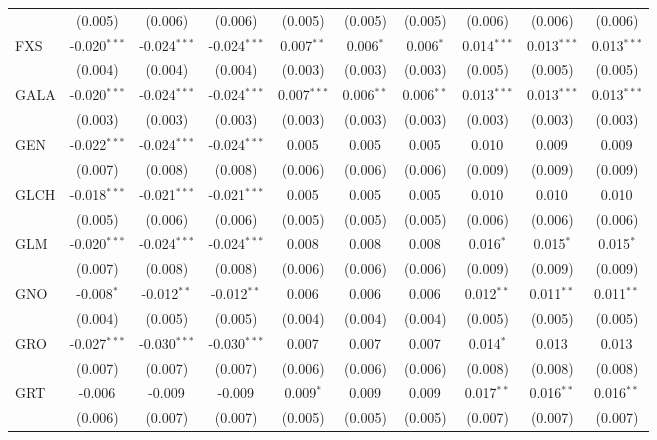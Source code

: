 \begin{table}[!htbp]
\begin{tabular}{@{\extracolsep{5pt}}lccccccccc}
  & (0.005) & (0.006) & (0.006) & (0.005) & (0.005) & (0.005) & (0.006) & (0.006) & (0.006) \\
 FXS & -0.020$^{***}$ & -0.024$^{***}$ & -0.024$^{***}$ & 0.007$^{**}$ & 0.006$^{*}$ & 0.006$^{*}$ & 0.014$^{***}$ & 0.013$^{***}$ & 0.013$^{***}$ \\
  & (0.004) & (0.004) & (0.004) & (0.003) & (0.003) & (0.003) & (0.005) & (0.005) & (0.005) \\
 GALA & -0.020$^{***}$ & -0.024$^{***}$ & -0.024$^{***}$ & 0.007$^{***}$ & 0.006$^{**}$ & 0.006$^{**}$ & 0.013$^{***}$ & 0.013$^{***}$ & 0.013$^{***}$ \\
  & (0.003) & (0.003) & (0.003) & (0.003) & (0.003) & (0.003) & (0.003) & (0.003) & (0.003) \\
 GEN & -0.022$^{***}$ & -0.024$^{***}$ & -0.024$^{***}$ & 0.005$^{}$ & 0.005$^{}$ & 0.005$^{}$ & 0.010$^{}$ & 0.009$^{}$ & 0.009$^{}$ \\
  & (0.007) & (0.008) & (0.008) & (0.006) & (0.006) & (0.006) & (0.009) & (0.009) & (0.009) \\
 GLCH & -0.018$^{***}$ & -0.021$^{***}$ & -0.021$^{***}$ & 0.005$^{}$ & 0.005$^{}$ & 0.005$^{}$ & 0.010$^{}$ & 0.010$^{}$ & 0.010$^{}$ \\
  & (0.005) & (0.006) & (0.006) & (0.005) & (0.005) & (0.005) & (0.006) & (0.006) & (0.006) \\
 GLM & -0.020$^{***}$ & -0.024$^{***}$ & -0.024$^{***}$ & 0.008$^{}$ & 0.008$^{}$ & 0.008$^{}$ & 0.016$^{*}$ & 0.015$^{*}$ & 0.015$^{*}$ \\
  & (0.007) & (0.008) & (0.008) & (0.006) & (0.006) & (0.006) & (0.009) & (0.009) & (0.009) \\
 GNO & -0.008$^{*}$ & -0.012$^{**}$ & -0.012$^{**}$ & 0.006$^{}$ & 0.006$^{}$ & 0.006$^{}$ & 0.012$^{**}$ & 0.011$^{**}$ & 0.011$^{**}$ \\
  & (0.004) & (0.005) & (0.005) & (0.004) & (0.004) & (0.004) & (0.005) & (0.005) & (0.005) \\
 GRO & -0.027$^{***}$ & -0.030$^{***}$ & -0.030$^{***}$ & 0.007$^{}$ & 0.007$^{}$ & 0.007$^{}$ & 0.014$^{*}$ & 0.013$^{}$ & 0.013$^{}$ \\
  & (0.007) & (0.007) & (0.007) & (0.006) & (0.006) & (0.006) & (0.008) & (0.008) & (0.008) \\
 GRT & -0.006$^{}$ & -0.009$^{}$ & -0.009$^{}$ & 0.009$^{*}$ & 0.009$^{}$ & 0.009$^{}$ & 0.017$^{**}$ & 0.016$^{**}$ & 0.016$^{**}$ \\
  & (0.006) & (0.007) & (0.007) & (0.005) & (0.005) & (0.005) & (0.007) & (0.007) & (0.007) \\

\end{tabular}
\end{table}
